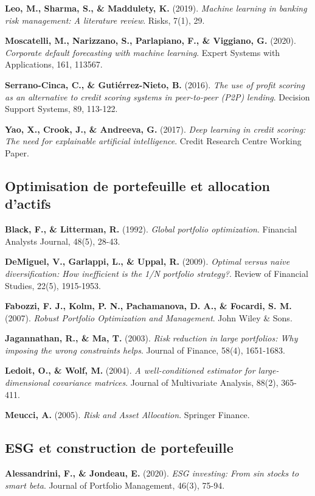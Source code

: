 \textbf{Leo, M., Sharma, S., \& Maddulety, K.} (2019). \textit{Machine learning in banking risk management: A literature review}. Risks, 7(1), 29.

\textbf{Moscatelli, M., Narizzano, S., Parlapiano, F., \& Viggiano, G.} (2020). \textit{Corporate default forecasting with machine learning}. Expert Systems with Applications, 161, 113567.

\textbf{Serrano-Cinca, C., \& Gutiérrez-Nieto, B.} (2016). \textit{The use of profit scoring as an alternative to credit scoring systems in peer-to-peer (P2P) lending}. Decision Support Systems, 89, 113-122.

\textbf{Yao, X., Crook, J., \& Andreeva, G.} (2017). \textit{Deep learning in credit scoring: The need for explainable artificial intelligence}. Credit Research Centre Working Paper.

\subsection{Optimisation de portefeuille et allocation d'actifs}

\textbf{Black, F., \& Litterman, R.} (1992). \textit{Global portfolio optimization}. Financial Analysts Journal, 48(5), 28-43.

\textbf{DeMiguel, V., Garlappi, L., \& Uppal, R.} (2009). \textit{Optimal versus naive diversification: How inefficient is the 1/N portfolio strategy?}. Review of Financial Studies, 22(5), 1915-1953.

\textbf{Fabozzi, F. J., Kolm, P. N., Pachamanova, D. A., \& Focardi, S. M.} (2007). \textit{Robust Portfolio Optimization and Management}. John Wiley \& Sons.

\textbf{Jagannathan, R., \& Ma, T.} (2003). \textit{Risk reduction in large portfolios: Why imposing the wrong constraints helps}. Journal of Finance, 58(4), 1651-1683.

\textbf{Ledoit, O., \& Wolf, M.} (2004). \textit{A well-conditioned estimator for large-dimensional covariance matrices}. Journal of Multivariate Analysis, 88(2), 365-411.

\textbf{Meucci, A.} (2005). \textit{Risk and Asset Allocation}. Springer Finance.

\subsection{ESG et construction de portefeuille}

\textbf{Alessandrini, F., \& Jondeau, E.} (2020). \textit{ESG investing: From sin stocks to smart beta}. Journal of Portfolio Management, 46(3), 75-94.

